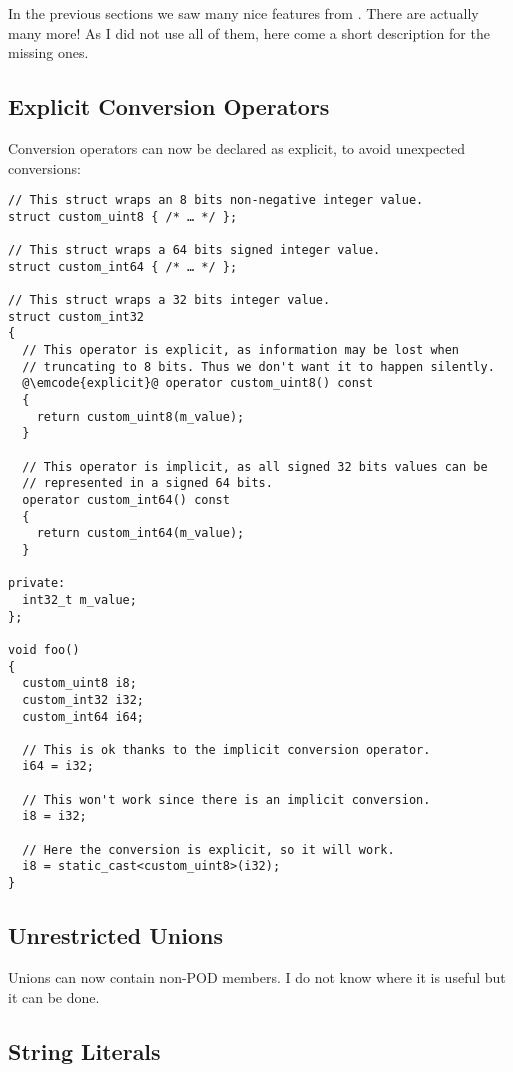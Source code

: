 In the previous sections we saw many nice features from . There
are actually many more! As I did not use all of them, here come a
short description for the missing ones.

\subsection{Explicit Conversion Operators}

Conversion operators can now be declared as explicit, to avoid
unexpected conversions:

\begin{lstlisting}
// This struct wraps an 8 bits non-negative integer value.
struct custom_uint8 { /* … */ };

// This struct wraps a 64 bits signed integer value.
struct custom_int64 { /* … */ };

// This struct wraps a 32 bits integer value.
struct custom_int32
{
  // This operator is explicit, as information may be lost when
  // truncating to 8 bits. Thus we don't want it to happen silently.
  @\emcode{explicit}@ operator custom_uint8() const
  {
    return custom_uint8(m_value);
  }

  // This operator is implicit, as all signed 32 bits values can be
  // represented in a signed 64 bits.
  operator custom_int64() const
  {
    return custom_int64(m_value);
  }

private:
  int32_t m_value;
};

void foo()
{
  custom_uint8 i8;
  custom_int32 i32;
  custom_int64 i64;

  // This is ok thanks to the implicit conversion operator.
  i64 = i32;

  // This won't work since there is an implicit conversion.
  i8 = i32;

  // Here the conversion is explicit, so it will work.
  i8 = static_cast<custom_uint8>(i32);
}
\end{lstlisting}

\subsection{Unrestricted Unions}

Unions can now contain non-POD members. I do not know where it is
useful but it can be done.

\subsection{String Literals}

